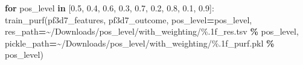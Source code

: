 \documentclass[
  11pt,
  oneside]{book}
\newenvironment{Shaded}{\begin{snugshade}}{\end{snugshade}}
\newcommand{\ControlFlowTok}[1]{\textcolor[rgb]{0.13,0.29,0.53}{\textbf{#1}}}
\newcommand{\FloatTok}[1]{\textcolor[rgb]{0.00,0.00,0.81}{#1}}
\newcommand{\KeywordTok}[1]{\textcolor[rgb]{0.13,0.29,0.53}{\textbf{#1}}}
\newcommand{\NormalTok}[1]{#1}
\newcommand{\OperatorTok}[1]{\textcolor[rgb]{0.81,0.36,0.00}{\textbf{#1}}}
\newcommand{\SpecialCharTok}[1]{\textcolor[rgb]{0.00,0.00,0.00}{#1}}
\newcommand{\StringTok}[1]{\textcolor[rgb]{0.31,0.60,0.02}{#1}}
\begin{document}
\begin{Shaded}
\begin{Highlighting}[]
\ControlFlowTok{for}\NormalTok{ pos\_level }\KeywordTok{in}\NormalTok{ [}\FloatTok{0.5}\NormalTok{, }\FloatTok{0.4}\NormalTok{, }\FloatTok{0.6}\NormalTok{, }\FloatTok{0.3}\NormalTok{, }\FloatTok{0.7}\NormalTok{, }\FloatTok{0.2}\NormalTok{, }\FloatTok{0.8}\NormalTok{, }\FloatTok{0.1}\NormalTok{, }\FloatTok{0.9}\NormalTok{]:}
\NormalTok{    train\_purf(pf3d7\_features, pf3d7\_outcome, pos\_level}\OperatorTok{=}\NormalTok{pos\_level,}
\NormalTok{        res\_path}\OperatorTok{=}\StringTok{\textquotesingle{}\textasciitilde{}/Downloads/pos\_level/with\_weighting/}\SpecialCharTok{\%.1f}\StringTok{\_res.tsv\textquotesingle{}} \OperatorTok{\%}\NormalTok{ pos\_level,}
\NormalTok{        pickle\_path}\OperatorTok{=}\StringTok{\textquotesingle{}\textasciitilde{}/Downloads/pos\_level/with\_weighting/}\SpecialCharTok{\%.1f}\StringTok{\_purf.pkl\textquotesingle{}} \OperatorTok{\%}\NormalTok{ pos\_level)}
\end{Highlighting}
\end{Shaded}
\end{document}
